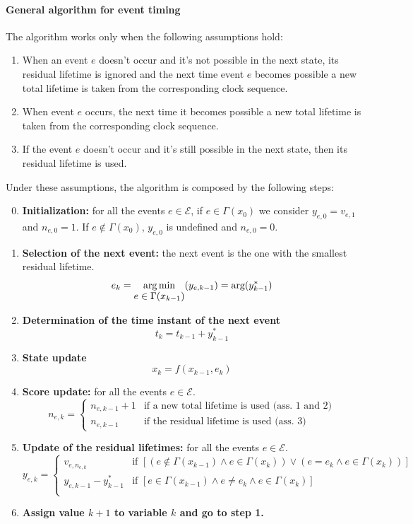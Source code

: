 \documentclass[12pt,a4paper]{article}
\DeclareMathOperator*{\argmin}{arg\,min}
\begin{document}
\paragraph{General algorithm for event timing} The algorithm works only when the following assumptions hold:
\begin{enumerate}
\item When an event $e$ doesn’t occur and it’s not possible in the next state, its residual lifetime is ignored and the next time event $e$ becomes possible a new total lifetime is taken from the corresponding clock sequence.
\item When event $e$ occurs, the next time it becomes possible a new total lifetime is taken from the corresponding clock sequence.
\item If the event $e$ doesn’t occur and it’s still possible in the next state, then its residual lifetime is used.
\end{enumerate}
\noindent
Under these assumptions, the algorithm is composed by the following steps:
\begin{enumerate}
\setcounter{enumi}{-1}
\item \textbf{Initialization:} for all the events $e\in\mathcal{E}$, if $e\in\Gamma(x_0)$ we consider $y_{e,0}=v_{e,1}$ and $n_{e,0}=1$. If $e\notin\Gamma(x_0)$, $y_{e,0}$ is undefined and $n_{e,0}=0$.
\item \textbf{Selection of the next event:} the next event is the one with the smallest residual lifetime.
$$
e_k = \argmin\limits_{\mathlarger{e\in\Gamma(x_{k-1})}} (y_{e,k-1}) = \text{arg} (y_{k-1}^*)
$$
\item \textbf{Determination of the time instant of the next event}
$$
t_k=t_{k-1}+y_{k-1}^*
$$
\item \textbf{State update}
$$
x_{k}=f(x_{k-1},e_{k})
$$
\item \textbf{Score update:}
for all the events $e\in\mathcal{E}$.
$$
n_{e,k}=
\begin{cases}
n_{e,k-1}+1 & \text{if a new total lifetime is used (ass. 1 and 2)} \\
n_{e,k-1} & \text{if the residual lifetime is used (ass. 3)}
\end{cases}
$$
\item \textbf{Update of the residual lifetimes:}
for all the events $e\in\mathcal{E}$.
$$
y_{e,k}=
\begin{cases}
v_{e,n_{e,k}} & \text{if } \left[\left(e\notin\Gamma(x_{k-1})\wedge e\in\Gamma(x_{k})\right)\vee\left(e=e_{k} \wedge e\in \Gamma(x_{k})\right)\right] \\
y_{e,k-1}-y_{k-1}^{*} & \text{if } \left[e\in\Gamma(x_{k-1})\wedge e\neq e_{k} \wedge e\in\Gamma(x_{k}) \right] \\
\end{cases}
$$
\item \textbf{Assign value $k+1$ to variable $k$ and go to step 1.}
\end{enumerate}
\end{document}
